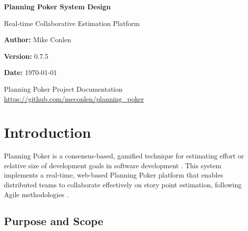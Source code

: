 \documentclass[11pt,a4paper]{article}
\begin{document}
\begin{titlepage}
    \centering
    \vspace*{2cm}
    
    {\Huge\bfseries Planning Poker System Design}
    
    \vspace{1cm}
    {\Large Real-time Collaborative Estimation Platform}
    
    \vspace{2cm}
    {\large\textbf{Author:} Mike Conlen}
    
    \vspace{1cm}
    {\large\textbf{Version:} 0.7.5}
    
    \vspace{1cm}
    {\large\textbf{Date:} \today}
    
    \vspace{3cm}
    
    \begin{abstract}
    This document describes the architectural design and implementation of a real-time Planning Poker system built with Go and WebSockets. The system provides a collaborative platform for Agile development teams to perform story point estimation in distributed environments. This specification covers the system architecture, WebSocket message protocols, session management, and security considerations.
    \end{abstract}
    
    \vfill
    
    {\small Planning Poker Project Documentation\\
    \url{https://github.com/meconlen/planning_poker}}
    
\end{titlepage}

\tableofcontents
\newpage

\section{Introduction}

Planning Poker is a consensus-based, gamified technique for estimating effort or relative size of development goals in software development \cite{grenning2002planning}. This system implements a real-time, web-based Planning Poker platform that enables distributed teams to collaborate effectively on story point estimation, following Agile methodologies \cite{schwaber2020scrum}.

\subsection{Purpose and Scope}
\end{document}
